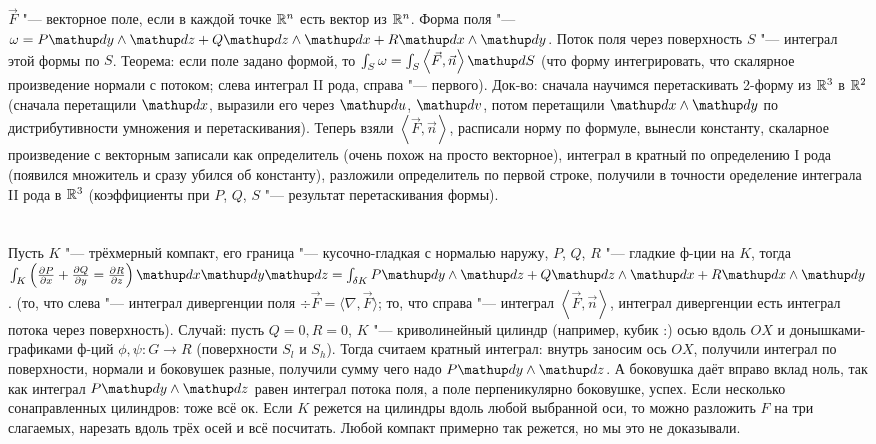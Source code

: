 \section{} %
$\vec F$ "--- векторное поле, если в каждой точке $\mathbb{R}^n$ есть вектор из $\mathbb{R}^n$.
Форма поля "--- $\omega = P\d y \wedge \d z + Q\d z \wedge \d x + R\d x \wedge \d y$.
Поток поля через поверхность $S$ "--- интеграл этой формы по $S$.
Теорема: если поле задано формой, то $\int_S \omega = \int_S \left<\vec F, \vec n\right> \d S$ (что форму интегрировать, что скалярное произведение нормали с потоком;
слева интеграл II рода, справа "--- первого).
Док-во: сначала научимся перетаскивать 2-форму из $\mathbb{R}^3$ в $\mathbb{R}^2$ (сначала перетащили $\d x$, выразили его через $\d u$, $\d v$,
потом перетащили $\d x \wedge \d y$ по дистрибутивности умножения и перетаскивания).
Теперь взяли $\left<\vec F, \vec n\right>$, расписали норму по формуле, вынесли константу, скаларное произведение с векторным записали как определитель
(очень похож на просто векторное), интеграл в кратный по определению I рода (появился множитель и сразу убился об константу), разложили
определитель по первой строке, получили в точности оределение интеграла II рода в $\mathbb{R}^3$ (коэффициенты при $P$, $Q$, $S$ "--- результат перетаскивания формы).

\section{} %
Пусть $K$ "--- трёхмерный компакт, его граница "--- кусочно-гладкая с нормалью наружу, $P$, $Q$, $R$ "--- гладкие ф-ции на $K$,
тогда $\int_K \left( \partd{P}{x} + \partd{Q}{y} = \partd{R}{z} \right)\d x\d y\d z = \int_{\delta K} P\d y \wedge \d z + Q\d z \wedge \d x + R\d x \wedge \d y$.
(то, что слева "--- интеграл дивергенции поля $\div \vec F = \langle\nabla, \vec F\rangle$; то, что справа "--- интеграл $\left< \vec F, \vec n \right>$,
интеграл дивергенции есть интеграл потока через поверхность).
Случай: пусть $Q=0,R=0$, $K$ "--- криволинейный цилиндр (например, кубик :) осью вдоль $OX$ и донышками-графиками ф-ций $\phi, \psi \colon G \to R$ (поверхности $S_l$ и $S_h$).
Тогда считаем кратный интеграл: внутрь заносим ось $OX$, получили интеграл по поверхности, нормали и боковушек разные, получили сумму чего надо $P\d y \wedge \d z$.
А боковушка даёт вправо вклад ноль, так как интеграл $P \d y \wedge \d z$ равен интеграл потока поля, а поле перпеникулярно боковушке, успех.
Если несколько сонаправленных цилиндров: тоже всё ок.
Если $K$ режется на цилиндры вдоль любой выбранной оси, то можно разложить $F$ на три слагаемых, нарезать вдоль трёх осей и всё посчитать.
Любой компакт примерно так режется, но мы это не доказывали.

\section{} %
\TODO
